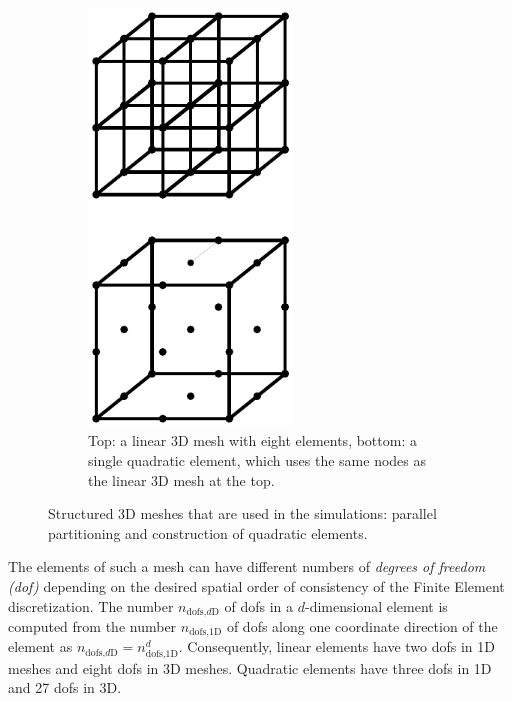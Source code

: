 \begin{figure}
\begin{subfigure}[t]{0.45\textwidth}
    \includegraphics[width=0.6\textwidth]{images/fiber_creation/quadratic_elements.pdf}%
    \caption{Top: a linear 3D mesh with eight elements, bottom: a single quadratic element, which uses the same nodes as the linear 3D mesh at the top.}%
    \label{fig:fiber_creation_quadratic_elements}%
  \end{subfigure}    
  \caption{Structured 3D meshes that are used in the simulations: parallel partitioning and construction of quadratic elements.}%
  \label{fig:quadratic_elements_decomposition}%
\end{figure}%

The elements of such a mesh can have different numbers of \emph{degrees of freedom (dof)} depending on the desired spatial order of consistency of the Finite Element discretization. The number $n_{\text{dofs,}d\text{D}}$ of dofs in a $d$-dimensional element is computed from the number $n_{\text{dofs,1D}}$ of dofs along one coordinate direction of the element as $n_{\text{dofs,}d\text{D}} = n_{\text{dofs,1D}}^d$.
Consequently, linear elements have two dofs in 1D meshes and eight dofs in 3D meshes. Quadratic elements have three dofs in 1D and 27 dofs in 3D.

